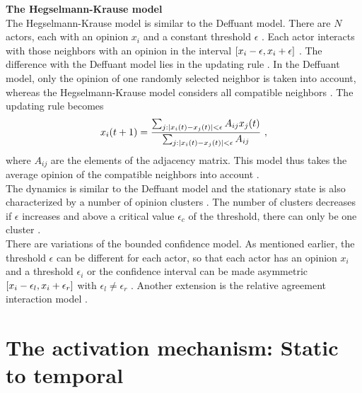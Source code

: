 \documentclass[11 pt , letterpaper , twoside , openright]{book}
\begin{document}
\newline
\textbf{The Hegselmann-Krause model}\\
\newline
The Hegselmann-Krause model is similar to the Deffuant model. There are $N$ actors, each with an opinion $x_i$ and a constant threshold $\epsilon$ \cite{Castellano2009}. Each actor interacts with those neighbors with an opinion in the interval $\interval{x_i-\epsilon}{x_i+\epsilon}$ \cite{Castellano2009}. The difference with the Deffuant model lies in the updating rule \cite{Castellano2009}. In the Deffuant model, only the opinion of one randomly selected neighbor is taken into account, whereas the Hegselmann-Krause model considers all compatible neighbors \cite{Castellano2009}. The updating rule becomes \cite{Castellano2009}
\begin{equation}
	x_i(t+1) = \frac{\sum_{j:\abs{x_i(t) - x_j(t)}<\epsilon}A_{ij}x_j(t)}{\sum_{j:\abs{x_i(t) - x_j(t)}<\epsilon}A_{ij}} \ ,
\end{equation}
where $A_{ij}$ are the elements of the adjacency matrix. This model thus takes the average opinion of the compatible neighbors into account \cite{Castellano2009}.\\
\newline
The dynamics is similar to the Deffuant model and the stationary state is also characterized by a number of opinion clusters \cite{Castellano2009}. The number of clusters decreases if $\epsilon$ increases and above a critical value $\epsilon_c$ of the threshold, there can only be one cluster \cite{Castellano2009}.\\
\newline
There are variations of the bounded confidence model. As mentioned earlier, the threshold $\epsilon$ can be different for each actor, so that each actor has an opinion $x_i$ and a threshold $\epsilon_i$ or the confidence interval can be made asymmetric $\interval{x_i - \epsilon_l}{x_i + \epsilon_r}$ with $\epsilon_l \neq
\epsilon_r$ \cite{Krause2002}. Another extension is the relative agreement interaction model \cite{Deffuant2006}\cite{Deffuant2002}.

\section{The activation mechanism: Static to temporal}\label{actMech}
\end{document}
